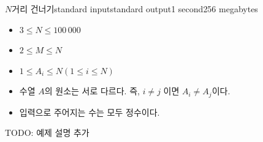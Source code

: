 \begin{problem}{$N$거리 건너기}{standard input}{standard output}{1 second}{256 megabytes}
\Examples

\begin{example}
%
%
\end{example}

\Note
\begin{itemize}
    \item $3 \le N \le 100\,000$
    \item $2 \le M \le N$
    \item $1 \le A_i \le N (1 \le i \le N)$
    \item 수열 $A$의 원소는 서로 다르다. 즉, $i \ne j$ 이면 $A_i \ne A_j$이다.
    \item 입력으로 주어지는 수는 모두 정수이다.
\end{itemize}

TODO: 예제 설명 추가

\end{problem}


